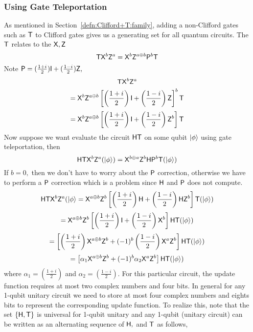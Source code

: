 \subsubsection{Using Gate Teleportation}
As mentioned in  Section~\ref{defn:Clifford+T:family}, adding a non-Clifford gates  such as ${\sf T}$ to Clifford gates gives us a generating set for all quantum circuits. The ${\sf T}$ relates to the ${\sf X}, {\sf Z}$
$${\sf T} {\sf X}^b {\sf Z}^a={\sf X}^b {\sf Z}^{a\oplus b}{\sf P}^b {\sf T}$$
Note  ${\sf P}=(\frac{1+i}{2}) {\sf I} + (\frac{1-i}{2}){\sf Z},$
$${\sf T} {\sf X}^b {\sf Z}^a$$
$$={\sf X}^b {\sf Z}^{a\oplus b}\left[\left(\frac{1+i}{2}\right) {\sf I} + \left(\frac{1-i}{2}\right){\sf Z}\right]^b {\sf T}$$
$$={\sf X}^b {\sf Z}^{a\oplus b}\left[\left(\frac{1+i}{2}\right) {\sf I} + \left(\frac{1-i}{2}\right){\sf Z}^b\right] {\sf T}$$
Now suppose we  want evaluate the circuit ${\sf H} {\sf T}$ on some qubit ${\lvert}\phi\rangle$ using gate teleportation, then
 $${\sf H} {\sf T} {\sf X}^b {\sf Z}^a ({\lvert}\phi\rangle) = {\sf X}^{b\oplus a} {\sf Z}^b {\sf H} {\sf P}^b {\sf T}({\lvert}\phi\rangle)$$
 If $b=0,$ then we don't have to worry about the ${\sf P}$ correction, otherwise we have to perform a ${\sf P}$ correction which is a problem since  ${\sf H}$ and ${\sf P}$ does not compute.
 $${\sf H} {\sf T} {\sf X}^b {\sf Z}^a ({\lvert}\phi\rangle={\sf X}^{a\oplus b} {\sf Z}^b  \left[\left(\frac{1+i}{2}\right) {\sf H} + \left(\frac{1-i}{2}\right){\sf H}{\sf Z}^b\right] {\sf T}({\lvert}\phi\rangle)$$
$$= {\sf X}^{a\oplus b} {\sf Z}^b  \left[\left(\frac{1+i}{2}\right) {\sf I} + \left(\frac{1-i}{2}\right){\sf X}^b\right] {\sf H}{\sf T}({\lvert}\phi\rangle)$$
$$=\left[\left(\frac{1+i}{2}\right){\sf X}^{a\oplus b} {\sf Z}^b  + (-1)^b\left(\frac{1-i}{2}\right)  {\sf X}^{a} {\sf Z}^b\right]{\sf H}{\sf T}({\lvert}\phi\rangle)$$
$$=\left[\alpha_1{\sf X}^{a\oplus b} {\sf Z}^b  + (-1)^b\alpha_2  {\sf X}^{a} {\sf Z}^b\right]{\sf H}{\sf T}({\lvert}\phi\rangle)$$
 where $\alpha_1=\left(\frac{1+i}{2}\right)$ and $\alpha_2=\left(\frac{1-i}{2}\right).$ For this particular circuit, the update function requires at most two complex numbers and four bits.
 In general for any 1-qubit  unitary circuit we need to store at most four complex numbers and eights bits to represent the corresponding update function. To realize this, note that the set $\{{\sf H},  {\sf T}\}$ is universal for 1-qubit unitary and any 1-qubit (unitary circuit) can be written as an alternating sequence of ${\sf H},$ and ${\sf T}$ as follows,

